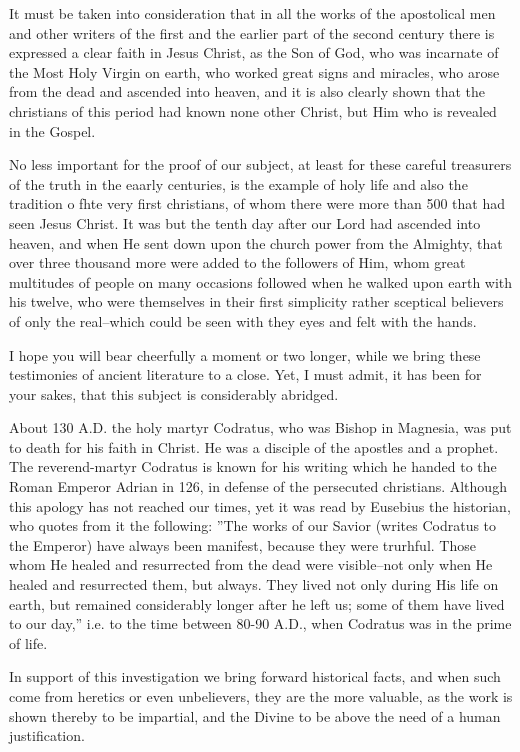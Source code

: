 It must be taken into consideration that in all the works of the apostolical men and other writers of the first and the earlier part of the second century there is expressed a clear faith in Jesus Christ, as the Son of God, who was incarnate of the Most Holy Virgin on earth, who worked great signs and miracles, who arose from the dead and ascended into heaven, and it is also clearly shown that the christians of this period had known none other Christ, but Him who is revealed in the Gospel.

No less important for the proof of our subject, at least for these careful treasurers of the truth in the eaarly centuries, is the example of holy life and also the tradition o fhte very first christians, of whom there were more than 500 that had seen Jesus Christ. It was but the tenth day after our Lord had ascended into heaven, and when He sent down upon the church power from the Almighty, that over three thousand more were added to the followers of Him, whom great multitudes of people on many occasions followed when he walked upon earth with his twelve, who were themselves in their first simplicity rather sceptical believers of only the real--which could be seen with they eyes and felt with the hands.

I hope you will bear cheerfully a moment or two longer, while we bring these testimonies of ancient literature to a close. Yet, I must admit, it has been for your sakes, that this subject is considerably abridged.

About 130 A.D. the holy martyr Codratus, who was Bishop in Magnesia, was put to death for his faith in Christ. He was a disciple of the apostles and a prophet. The reverend-martyr Codratus is known for his writing which he handed to the Roman Emperor Adrian in 126, in defense of the persecuted christians. Although this apology has not reached our times, yet it was read by Eusebius the historian, who quotes from it the following: ''The works of our Savior (writes Codratus to the Emperor) have always been manifest, because they were trurhful. Those whom He healed and resurrected from the dead were visible--not only when He healed and resurrected them, but always. They lived not only during His life on earth, but remained considerably longer after he left us; some of them have lived to our day,'' i.e. to the time between 80-90 A.D., when Codratus was in the prime of life.

In support of this investigation we bring forward historical facts, and when such come from heretics or even unbelievers, they are the more valuable, as the work is shown thereby to be impartial, and the Divine to be above the need of a human justification.

